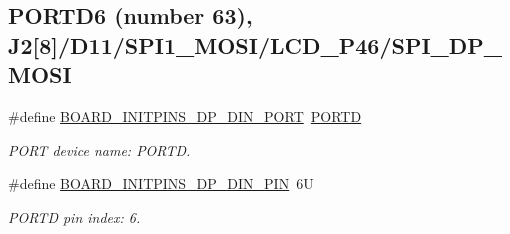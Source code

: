 \subsection*{P\+O\+R\+T\+D6 (number 63), J2\mbox{[}8\mbox{]}/\+D11/\+S\+P\+I1\+\_\+\+M\+O\+S\+I/\+L\+C\+D\+\_\+\+P46/\+S\+P\+I\+\_\+\+D\+P\+\_\+\+M\+O\+SI}
\begin{DoxyCompactItemize}
\item 
\mbox{\label{group__pin__mux_ga45c928d07cb4c9b45405c76d031457e7}} 
\#define \mbox{\hyperlink{group__pin__mux_ga45c928d07cb4c9b45405c76d031457e7}{B\+O\+A\+R\+D\+\_\+\+I\+N\+I\+T\+P\+I\+N\+S\+\_\+\+D\+P\+\_\+\+D\+I\+N\+\_\+\+P\+O\+RT}}~\mbox{\hyperlink{group___p_o_r_t___peripheral___access___layer_ga3e6a2517db4f9cb7c9037adf0aefe79b}{P\+O\+R\+TD}}
\begin{DoxyCompactList}\small\item\em P\+O\+RT device name\+: P\+O\+R\+TD. \end{DoxyCompactList}\item 
\mbox{\label{group__pin__mux_gadb7a4e5908c87628a6698990b567c0e3}} 
\#define \mbox{\hyperlink{group__pin__mux_gadb7a4e5908c87628a6698990b567c0e3}{B\+O\+A\+R\+D\+\_\+\+I\+N\+I\+T\+P\+I\+N\+S\+\_\+\+D\+P\+\_\+\+D\+I\+N\+\_\+\+P\+IN}}~6U
\begin{DoxyCompactList}\small\item\em P\+O\+R\+TD pin index\+: 6. \end{DoxyCompactList}\end{DoxyCompactItemize}
